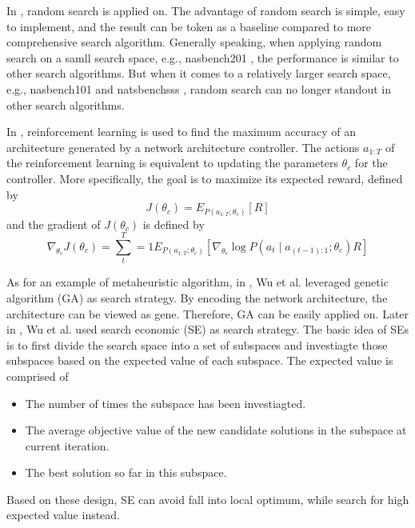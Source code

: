 \documentclass[sigconf]{acmart}
\begin{document}
    In \cite{https://doi.org/10.48550/arxiv.2006.04647} \cite{Lopes_2021}, random search is applied on. 
    The advantage of random search is simple, easy to implement, and the result can be token as a 
    baseline compared to more comprehensive search algorithm. Generally speaking, when applying random 
    search on a samll search space, e.g., nasbench201 \cite{dong2020nasbench201}, the performance is 
    similar to other search algorithms. But when it comes to a relatively larger search space, e.g., nasbench101 
    \cite{ying2019nasbench101} and natsbenchsss \cite{Dong_2021}, random search can no longer standout 
    in other search algorithms. 

    In \cite{zoph2017neural}, reinforcement learning is used to find the maximum accuracy of an architecture 
    generated by a network architecture controller. The actions $a_{1:T}$ of the reinforcement learning is 
    equivalent to updating the parameters $\theta_c$ for the controller. More specifically, the goal is to maximize 
    its expected reward, defined by 
    \begin{equation}
        \label{equ:reinforcement_rw}
        J(\theta_c)=E_{P(a_{1:T};\theta_c)}[R]
    \end{equation}
    and the gradient of $J(\theta_c)$ is defined by
    \begin{equation}
        \label{equ:reinforcement_grad}
        \nabla_{\theta_c} J(\theta_c)=\sum^T_t=1 E_{P(a_{1:T};\theta_c)}[\nabla_{\theta_c}\log P(a_t\mid a_{(t-1):1};\theta_c)R]
    \end{equation}

    As for an example of metaheuristic algorithm, in \cite{10.1145/3491396.3506510}, Wu et al. leveraged 
    genetic algorithm (GA) as search strategy. 
    By encoding the network architecture, the architecture can be viewed as gene. Therefore, GA can be 
    easily applied on. 
    Later in \cite{10092788}, Wu et al. used search economic (SE) \cite{7379579} as search strategy. The 
    basic idea of SEs is to first divide the search space into a set of subspaces and investiagte those 
    subspaces based on the expected value of each subspace. The expected value is comprised of 
    \begin{itemize}
        \item The number of times the subspace has been investiagted. 
        \item The average objective value of the new candidate solutions in the subspace at current iteration. 
        \item The best solution so far in this subspace. 
    \end{itemize}
    Based on these design, SE can avoid fall into local optimum, while search for high expected value instead. 
    
\end{document}

